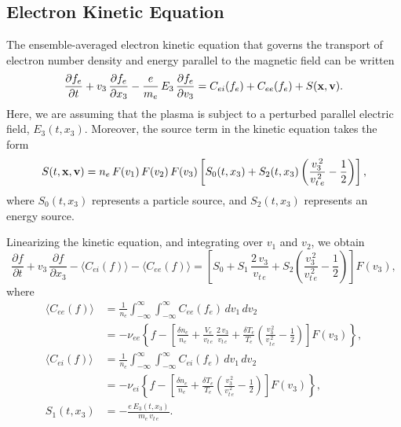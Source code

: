\documentclass[12pt,prb,aps]{revtex4-1}
\begin{document}
\subsection{Electron Kinetic Equation}
The  ensemble-averaged electron kinetic equation that governs the transport of electron number density
and energy parallel to the magnetic field can be written\,\cite{haz,rf0}
\begin{equation}
\frac{\partial f_e}{\partial t}+v_3\,\frac{\partial f_e}{\partial x_3} -\frac{e}{m_e}\,E_3\,\frac{\partial f_e}{\partial v_3} = C_{ei}(f_e) + C_{ee}(f_e) + S({\bf x},{\bf v}).
\end{equation}
Here, we are assuming that the plasma is subject to a perturbed parallel electric
field, $E_3(t,x_3)$. Moreover, the source term in the kinetic equation takes the form 
\begin{equation}
S(t,{\bf x},{\bf v}) = n_e\,F(v_1)\,F(v_2)\,F(v_3)\left[S_0(t,x_3) +S_2(t,x_3)\left(\frac{v_3^{\,2}}{v_{t\,e}^{\,2}}-\frac{1}{2}\right) \right],
\end{equation}
where $S_0(t,x_3)$ represents a particle source, and $S_2(t,x_3)$ represents an energy source. 

Linearizing the kinetic equation, and integrating over $v_1$ and $v_2$, we obtain
\begin{equation}\label{e40}
\frac{\partial f}{\partial t}+v_3\,\frac{\partial f}{\partial x_3} - \langle C_{ei}( f)\rangle- \langle C_{ee}(f)\rangle = \left[
S_0 +S_1\,\frac{2\,v_3}{v_{t\,e}} +S_2 \left(\frac{v_3^{\,2}}{v_{t\,e}^{\,2}}-\frac{1}{2}\right)\right]F(v_3),
\end{equation}
where
\begin{align}\label{cee}
\langle C_{ee}(f)\rangle&= \frac{1}{n_e}\int_{-\infty}^\infty\!\int_{-\infty}^\infty C_{ee}(f_e)\,dv_1\,dv_2\nonumber\\[0.5ex]&= -\nu_{ee}\left\{f-\left[\frac{\delta n_e}{n_e}+\frac{ V_e}{v_{t\,e}}\,\frac{2\,v_3}{v_{t\,e}}
+\frac{\delta T_e}{T_e}\left(\frac{v_3^{\,2}}{v_{t\,e}^{\,2}}-\frac{1}{2}\right)\right]F(v_3)\right\},\\[0.5ex]
\langle C_{ei}(f)\rangle&= \frac{1}{n_e}\int_{-\infty}^\infty\!\int_{-\infty}^\infty C_{ei}(f_e)\,dv_1\,dv_2\nonumber\\[0.5ex]&=-\nu_{ei}\left\{f-\left[\frac{\delta n_e}{n_e}
+\frac{\delta T_e}{T_e}\left(\frac{v_3^{\,2}}{v_{t\,e}^{\,2}}-\frac{1}{2}\right)\right]F(v_3)\right\},\label{cei}\\[0.5ex]
S_1(t,x_3) &= - \frac{e\, E_3(t,x_3)}{m_e\,v_{t\,e}}.\label{s1}
\end{align}
\end{document}
